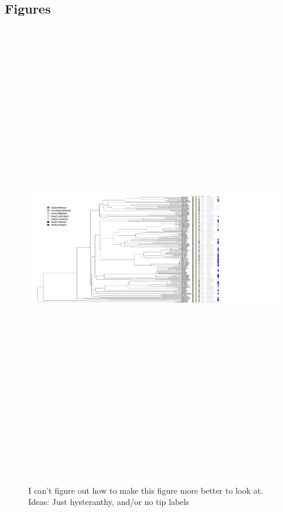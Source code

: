 \documentclass{article}\usepackage[]{graphicx}\usepackage[]{color}
\begin{document}
\begin{itemize}
\section*{Figures}
\begin{figure}[h!]
\includegraphics[width=20cm, height=20cm]{../figure/mich_phylo_alltraits.pdf}\\
\caption{I can't figure out how to make this figure more better to look at. Ideas: Just hysteranthy, and/or no tip labels}
\end{figure}
\begin{figure}[h!]

\end{figure}
\end{itemize}
\end{document}
